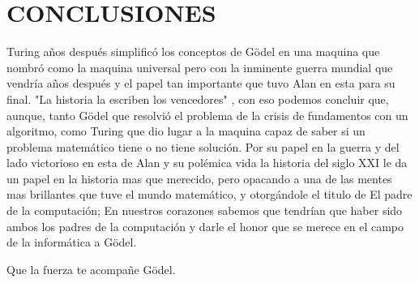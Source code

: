 \documentclass[12pt,letterpaper]{article}
\begin{document}
\underline{}


\section{CONCLUSIONES}

Turing años después simplificó los conceptos de Gödel en una maquina que nombró como la maquina universal pero con la inminente guerra mundial que vendría años después y el papel tan importante que tuvo Alan en esta para su final. "La historia la escriben los vencedores"\cite{george20071984} , con eso podemos concluir que, aunque, tanto Gödel que resolvió el problema de la crisis de fundamentos con un algoritmo, como Turing que dio lugar a la maquina capaz de saber si un problema matemático tiene o no tiene solución. Por su papel en la guerra y del lado victorioso en esta de Alan y su polémica vida la historia del siglo XXI le da un papel en la historia mas que merecido, pero opacando a una de las mentes mas brillantes que tuve el mundo matemático, y otorgándole el titulo de El padre de la computación; En nuestros corazones sabemos que tendrían que haber sido ambos los padres de la computación y darle el honor que se merece en el campo de la informática a Gödel.

Que la fuerza te acompañe Gödel.











\end{document}
